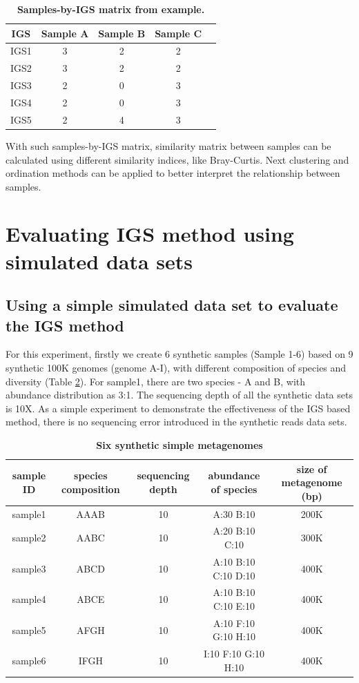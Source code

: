 \begin{table}[!ht]
\centering
\begin{tabular}{ |c | c |c| c|c| }
\hline 
    IGS & Sample A & Sample B & Sample C\\
\hline 
IGS1 & 3 & 2 & 2\\ 
IGS2 & 3 & 2 & 2\\ 
IGS3 & 2 & 0 & 3\\ 
IGS4 & 2 & 0 & 3\\ 
IGS5 & 2 & 4 & 3\\ 
\hline 
\end{tabular}
\caption{\bf Samples-by-IGS matrix from example.}
\label{table:sample_IGS_table}
\end{table}



With such samples-by-IGS matrix, similarity matrix between samples can be calculated using different similarity indices, like 
Bray-Curtis. Next clustering and ordination methods can be applied to better interpret the relationship between samples. 
    
    
\section{Evaluating IGS method using simulated data sets}
\subsection{Using a simple simulated data set to evaluate the IGS method}


For this experiment, firstly we create 6 synthetic samples (Sample 1-6) 
based on 9 synthetic 100K genomes (genome A-I), with different composition of species and diversity
(Table \ref{table:simulated_metag}). For sample1, there are two species - A and B, with abundance distribution as 3:1.
The sequencing depth of all the synthetic data sets is 10X. 
As a simple experiment to demonstrate the effectiveness of the IGS based method, 
there is no sequencing error introduced in the 
synthetic reads data sets.

\begin{table}[!ht]
\centering
\resizebox{16cm}{!} {
\begin{tabular}{ |c | c |c| c|c| }
\hline
sample ID & species composition & sequencing depth & abundance of species & size of metagenome (bp)\\
\hline
sample1        & AAAB & 10 & A:30 B:10 & 200K\\
sample2        & AABC & 10 & A:20 B:10 C:10 & 300K\\
sample3        & ABCD & 10 & A:10 B:10 C:10 D:10 & 400K\\
sample4        & ABCE & 10 & A:10 B:10 C:10 E:10 & 400K\\
sample5        & AFGH & 10 & A:10 F:10 G:10 H:10 & 400K\\
sample6        & IFGH & 10 & I:10 F:10 G:10 H:10 & 400K\\
\hline
\end{tabular}
}
\caption{
\bf{Six synthetic simple metagenomes}
}
\label{table:simulated_metag}
\end{table}

